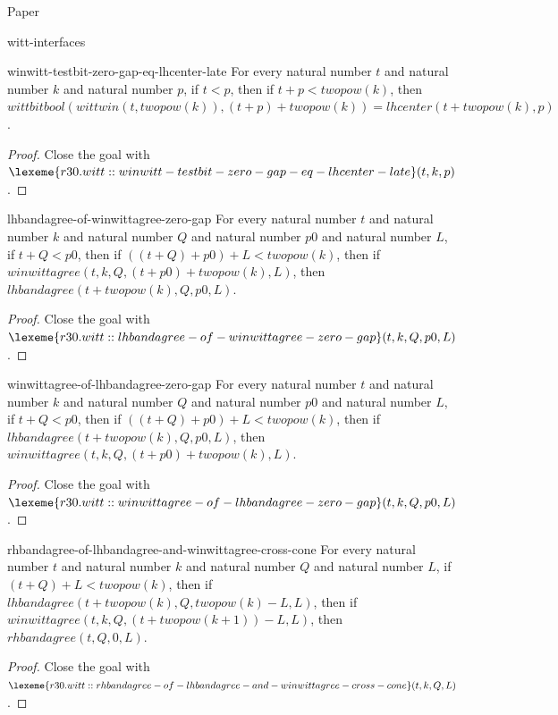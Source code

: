 \begin{lexlean}{Paper}
\begin{section}{witt-interfaces}
  \begin{theorem}{winwitt-testbit-zero-gap-eq-lhcenter-late}
  For every natural number \(t\) and natural number \(k\) and natural number \(p\), if \(t < p\), then if \(t + p < twopow(k)\), then \(wittbitbool(wittwin(t, twopow(k)), (t + p) + twopow(k)) = lhcenter(t + twopow(k), p)\).
  \begin{proof}
  Close the goal with \(\lexeme{r30.witt::winwitt-testbit-zero-gap-eq-lhcenter-late}(t, k, p)\).
  \end{proof}
  \end{theorem}

  \begin{theorem}{lhbandagree-of-winwittagree-zero-gap}
  For every natural number \(t\) and natural number \(k\) and natural number \(Q\) and natural number \(p0\) and natural number \(L\), if \(t + Q < p0\), then if \(((t + Q) + p0) + L < twopow(k)\), then if \(winwittagree(t, k, Q, (t + p0) + twopow(k), L)\), then \(lhbandagree(t + twopow(k), Q, p0, L)\).
  \begin{proof}
  Close the goal with \(\lexeme{r30.witt::lhbandagree-of-winwittagree-zero-gap}(t, k, Q, p0, L)\).
  \end{proof}
  \end{theorem}

  \begin{theorem}{winwittagree-of-lhbandagree-zero-gap}
  For every natural number \(t\) and natural number \(k\) and natural number \(Q\) and natural number \(p0\) and natural number \(L\), if \(t + Q < p0\), then if \(((t + Q) + p0) + L < twopow(k)\), then if \(lhbandagree(t + twopow(k), Q, p0, L)\), then \(winwittagree(t, k, Q, (t + p0) + twopow(k), L)\).
  \begin{proof}
  Close the goal with \(\lexeme{r30.witt::winwittagree-of-lhbandagree-zero-gap}(t, k, Q, p0, L)\).
  \end{proof}
  \end{theorem}

  \begin{theorem}{rhbandagree-of-lhbandagree-and-winwittagree-cross-cone}
  For every natural number \(t\) and natural number \(k\) and natural number \(Q\) and natural number \(L\), if \((t + Q) + L < twopow(k)\), then if \(lhbandagree(t + twopow(k), Q, twopow(k) - L, L)\), then if \(winwittagree(t, k, Q, (t + twopow(k + 1)) - L, L)\), then \(rhbandagree(t, Q, 0, L)\).
  \begin{proof}
  Close the goal with \(\lexeme{r30.witt::rhbandagree-of-lhbandagree-and-winwittagree-cross-cone}(t, k, Q, L)\).
  \end{proof}
  \end{theorem}


\end{section}
\end{lexlean}
